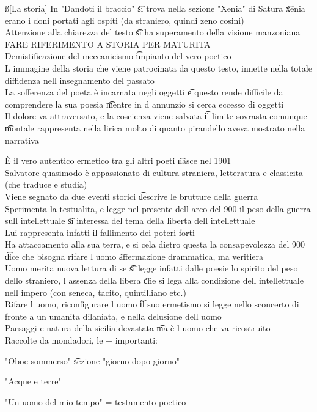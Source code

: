 \documentclass[12pt]{article}
\begin{document}
\ss[La storia]
In "Dandoti il braccio" \t si trova nella sezione "Xenia" di Satura \t xenia erano i doni portati agli ospiti (da straniero, quindi zeno cosini) \\
Attenzione alla chiarezza del testo \t si ha superamento della visione manzoniana \\
FARE RIFERIMENTO A STORIA PER MATURITA \\
Demistificazione del meccanicismo \t impianto del vero poetico \\
L immagine della storia che viene patrocinata da questo testo, innette nella totale diffidenza nell insegnamento del passato \\
La sofferenza del poeta è incarnata negli oggetti \t e questo rende difficile da comprendere la sua poesia \t mentre in d annunzio si cerca eccesso di oggetti \\
Il dolore va attraversato, e la coscienza viene salvata \t il limite sovrasta comunque \t montale rappresenta nella lirica molto di quanto pirandello aveva mostrato nella narrativa

È il vero autentico ermetico tra gli altri poeti \t nasce nel 1901 \\
Salvatore quasimodo è appassionato di cultura straniera, letteratura e classicita (che traduce e studia) \\
Viene segnato da due eventi storici \t descrive le brutture della guerra \\
Sperimenta la testualita, e legge nel presente dell arco del 900 il peso della guerra sull intellettuale \t si interessa del tema della liberta dell intellettuale \\
Lui rappresenta infatti il fallimento dei poteri forti \\
Ha attaccamento alla sua terra, e si cela dietro questa la consapevolezza del 900 \t dice che bisogna rifare l uomo \t affermazione drammatica, ma veritiera \\
Uomo merita nuova lettura di se \t si legge infatti dalle poesie lo spirito del peso dello straniero, l assenza della libera \t che si lega alla condizione dell intellettuale nell impero (con seneca, tacito, quintilliano etc.) \\
Rifare l uomo, riconfigurare l uomo \t il suo ermetismo si legge nello sconcerto di fronte a un umanita dilaniata, e nella delusione dell uomo \\
Paesaggi e natura della sicilia devastata \t ma è l uomo che va ricostruito \\
Raccolte da mondadori, le + importanti:
\bi
  \item "Oboe sommerso" \t sezione "giorno dopo giorno"
  \item "Acque e terre"
  \item "Un uomo del mio tempo" = testamento poetico
\ei
\end{document}
